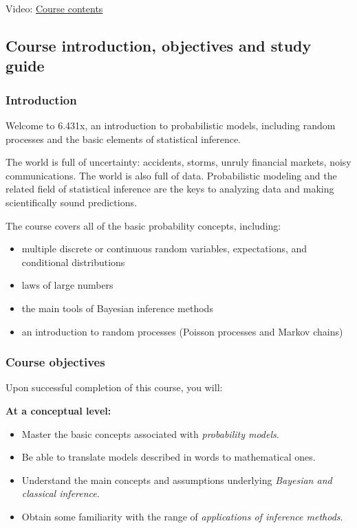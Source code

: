 \documentclass[pdftex, brazil, 12pt, twoside]{article}
\begin{document}
Video: \href{https://www.youtube.com/watch?v=6EZKb-Lo9IQ}{Course contents}


\subsection{Course introduction, objectives and study guide}
\label{ovw0-ci}

\subsubsection{Introduction}
\label{ovw0-ci-intro}

Welcome to 6.431x, an introduction to probabilistic models, including random
processes and the basic elements of statistical inference.

The world is full of uncertainty: accidents, storms, unruly financial markets,
noisy communications. The world is also full of data. Probabilistic modeling and
the related field of statistical inference are the keys to analyzing data and making
scientifically sound predictions.

The course covers all of the basic probability concepts, including:

\begin{itemize}[noitemsep]
\item multiple discrete or continuous random variables, expectations, and conditional distributions
\item laws of large numbers
\item the main tools of Bayesian inference methods
\item an introduction to random processes (Poisson processes and Markov chains)
\end{itemize}

\subsubsection{Course objectives}
\label{ovw0-ci-obj}

Upon successful completion of this course, you will:

\textbf{At a conceptual level:}

\begin{itemize}[noitemsep]
\item Master the basic concepts associated with \emph{probability models}.
\item Be able to translate models described in words to mathematical ones.
\item Understand the main concepts and assumptions underlying \emph{Bayesian and classical inference}.
\item Obtain some familiarity with the range of \emph{applications of inference methods}.
\end{itemize}
\end{document}
